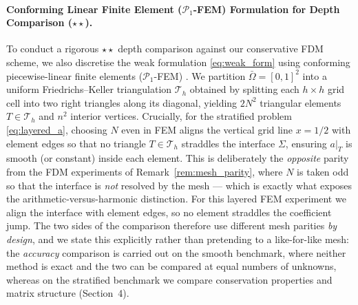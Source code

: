 \documentclass[11pt,a4paper]{article}
\theoremstyle{definition}
\theoremstyle{remark}
\begin{document}
\paragraph{Conforming Linear Finite Element ($\mathcal{P}_1$-FEM) Formulation for Depth Comparison ($\star\star$).}
To conduct a rigorous $\star\star$ depth comparison against our conservative FDM scheme, we also discretise the weak formulation \eqref{eq:weak_form} using conforming piecewise-linear finite elements ($\mathcal{P}_1$-FEM) \cite{hiptmair2025, quarteroni2017}. We partition $\bar{\Omega} = [0,1]^2$ into a uniform Friedrichs--Keller triangulation $\mathcal{T}_h$ obtained by splitting each $h \times h$ grid cell into two right triangles along its diagonal, yielding $2N^2$ triangular elements $T \in \mathcal{T}_h$ and $n^2$ interior vertices. Crucially, for the stratified problem \eqref{eq:layered_a}, choosing $N$ even in FEM aligns the vertical grid line $x = 1/2$ with element edges so that no triangle $T \in \mathcal{T}_h$ straddles the interface $\Sigma$, ensuring $a|_T$ is smooth (or constant) inside each element. This is deliberately the \emph{opposite} parity from the FDM experiments of Remark~\ref{rem:mesh_parity}, where $N$ is taken odd so that the interface is \emph{not} resolved by the mesh --- which is exactly what exposes the arithmetic-versus-harmonic distinction. For this layered FEM experiment we align the interface with element edges, so no element straddles the coefficient jump. The two sides of the comparison therefore use different mesh parities \emph{by design}, and we state this explicitly rather than pretending to a like-for-like mesh: the \emph{accuracy} comparison is carried out on the smooth benchmark, where neither method is exact and the two can be compared at equal numbers of unknowns, whereas on the stratified benchmark we compare conservation properties and matrix structure (Section~4).
\end{document}
